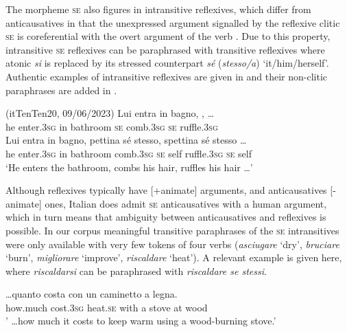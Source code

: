 \documentclass[output=paper,colorlinks,citecolor=brown
]{langscibook}
\begin{document}
The morpheme \textsc{se} also figures in intransitive reflexives, which differ from anticausatives in that the unexpressed argument signalled by the reflexive clitic \textsc{se} is coreferential with the overt argument of the verb \citep[257, 126--136]{vanvalin1990semantic,bentley2006split}. Due to this property, intransitive \textsc{se} reflexives can be paraphrased with transitive reflexives where atonic \textit{si} is replaced by its stressed counterpart \textit{sé} (\textit{stesso/a}) ‘it/him/herself’. Authentic examples of intransitive reflexives are given in  and their non-clitic paraphrases are added in .

\ea (itTenTen20, 09/06/2023) \label{bentley_example_4}
    \ea \label{bentley_example_4a}
    \gll Lui entra in bagno,  ,   \ldots  \\
    he enter.3\textsc{sg} in bathroom \textsc{se} comb.3\textsc{sg} \textsc{se} ruffle.3\textsc{sg} \\
    \ex \label{bentley_example_4b}
    \gll Lui entra in bagno, pettina sé stesso, spettina sé stesso \ldots  \\
    he enter.3\textsc{sg} in bathroom comb.3\textsc{sg} \textsc{se} self ruffle.3\textsc{sg} \textsc{se} self  \\
    \glt ‘He enters the bathroom, combs his hair, ruffles his hair  \ldots ’  \\
    \z
\z

Although reflexives typically have [+animate] arguments, and anticausatives [-animate] ones, Italian does admit \textsc{se} anticausatives with a human argument, which in turn means that ambiguity between anticausatives and reflexives is possible. In our corpus meaningful transitive paraphrases of the \textsc{se} intransitives were only available with very few tokens of four verbs (\textit{asciugare} ‘dry’, \textit{bruciare} ‘burn’, \textit{migliorare} ‘improve’, \textit{riscaldare} ‘heat’). A relevant example is given here, where \textit{riscaldarsi} can be paraphrased with \textit{riscaldare se stessi}.

\ea \label{bentley_example_5}
\gll  \ldots  quanto costa  con un caminetto a legna. \\
    how.much	cost.3\textsc{sg} heat.\textsc{se} with a stove at wood \\
\glt ' \ldots  how much it costs to keep warm using a wood-burning stove.’
\z
\end{document}
